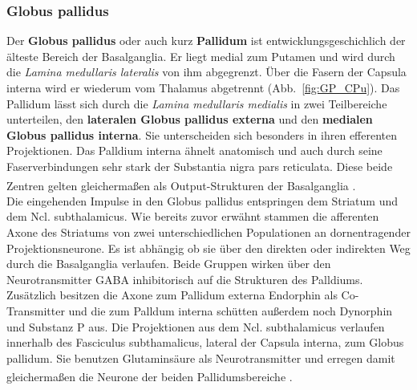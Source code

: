 \subsubsection*{Globus pallidus}  
Der \textbf{Globus pallidus} oder auch kurz \textbf{Pallidum} ist entwicklungsgeschichlich der älteste Bereich der Basalganglia. Er liegt medial zum Putamen und wird durch die \textit{Lamina medullaris lateralis} von ihm abgegrenzt. Über die Fasern der Capsula interna wird er wiederum vom Thalamus abgetrennt (Abb.~\ref{fig:GP_CPu}). Das Pallidum lässt sich durch die \textit{Lamina medullaris medialis} in zwei Teilbereiche unterteilen, den \textbf{lateralen Globus pallidus externa} und den \textbf{medialen Globus pallidus interna}. Sie unterscheiden sich besonders in ihren efferenten Projektionen. Das Palldium interna ähnelt anatomisch und auch durch seine Faserverbindungen sehr stark der Substantia nigra pars reticulata. Diese beide Zentren gelten gleichermaßen als Output-Strukturen der Basalganglia \textsuperscript{\cite[Kap.~14]{crossman2014neuroanatomy}}.\\ 
Die eingehenden Impulse in den Globus pallidus entspringen dem Striatum und dem Ncl. subthalamicus. Wie bereits zuvor erwähnt stammen die afferenten Axone des Striatums von zwei unterschiedlichen Populationen an dornentragender Projektionsneurone. Es ist abhängig ob sie über den direkten oder indirekten Weg durch die Basalganglia verlaufen. Beide Gruppen wirken über den Neurotransmitter GABA inhibitorisch auf die Strukturen des Palldiums. Zusätzlich besitzen die Axone zum Pallidum externa Endorphin als Co-Transmitter und die zum Palldum interna schütten außerdem noch Dynorphin und Substanz P aus. Die Projektionen aus dem Ncl. subthalamicus verlaufen innerhalb des Fasciculus subthamalicus, lateral der Capsula interna, zum Globus pallidum. Sie benutzen Glutaminsäure als Neurotransmitter und erregen damit gleichermaßen die Neurone der beiden Pallidumsbereiche \textsuperscript{\cite[Kap.~14]{crossman2014neuroanatomy}}.\\    
